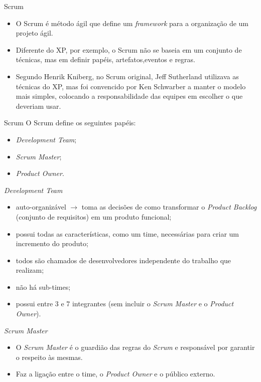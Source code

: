 \documentclass[11pt]{beamer}
\begin{document}
    \begin{frame}{Scrum}
      \begin{itemize}
        \item O Scrum é método ágil que define um \textit{framework} para a organização de um projeto ágil.
        \item Diferente do XP, por exemplo, o Scrum não se baseia em um conjunto de técnicas, mas em definir papéis, artefatos,eventos e regras.
        \item Segundo Henrik Kniberg, no Scrum original, Jeff Sutherland utilizava as técnicas do XP, mas foi convencido por Ken Schwarber a manter o modelo mais simples, colocando a responsabilidade das equipes em escolher o que deveriam usar. 
      \end{itemize}
    \end{frame}
    
    \begin{frame}{Scrum}
       O Scrum define os seguintes papéis:
       \begin{itemize}
         \item \textit{Development Team};
         \item \textit{Scrum Master};
         \item \textit{Product Owner}.
      \end{itemize}
    \end{frame}

    \begin{frame}{\textit{Development Team}}
      \begin{itemize}
         \item auto-organizável $\rightarrow$ toma as decisões de como transformar o \textit{Product Backlog} (conjunto de requisitos) em um produto funcional;
         \item possui todas as características, como um time, necessárias para criar um incremento do produto;
         \item todos são chamados de desenvolvedores independente do trabalho que realizam;
         \item não há sub-times;
         \item possui entre 3 e 7 integrantes (sem incluir o \textit{Scrum Master} e o \textit{Product Owner}).
      \end{itemize}
    \end{frame}

    \begin{frame}{\textit{Scrum Master}}
      \begin{itemize}
         \item O \textit{Scrum Master} é o guardião das regras do \textit{Scrum} e responsável por garantir o respeito às mesmas.
         \item Faz a ligação entre o time, o \textit{Product Owner} e o público externo.
      \end{itemize}
    \end{frame}
\end{document}
